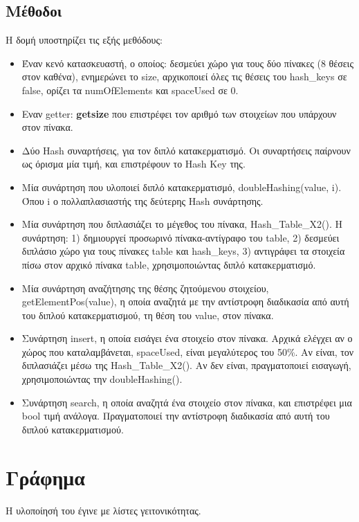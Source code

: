 \documentclass[12pt,a4paper]{article}
\begin{document}
    \subsection*{Μέθοδοι}
    Η δομή υποστηρίζει τις εξής μεθόδους:
    \begin{itemize}
        \item Έναν κενό κατασκευαστή, ο οποίος:  δεσμεύει χώρο  για  τους δύο πίνακες (8 θέσεις στον καθένα), 
        ενημερώνει το size, αρχικοποιεί όλες τις θέσεις του hash\_keys σε false, ορίζει τα numOfElements και spaceUsed σε 0. 
        \item Εναν getter: \textbf{getsize} που επιστρέφει τον αριθμό των στοιχείων που υπάρχουν στον πίνακα.
        \item Δύο Hash συναρτήσεις, για τον διπλό κατακερματισμό. Οι συναρτήσεις παίρνουν ως όρισμα μία τιμή, και επιστρέφουν το Hash Key της.
        \item Μία συνάρτηση που υλοποιεί διπλό κατακερματισμό, doubleHashing(value, i). Όπου i ο πολλαπλασιαστής της δεύτερης Hash συνάρτησης.
        \item Μία συνάρτηση που διπλασιάζει το μέγεθος του πίνακα, Hash\_Table\_X2(). Η συνάρτηση: 1) δημιουργεί προσωρινό πίνακα-αντίγραφο του table, 
        2) δεσμεύει διπλάσιο χώρο για τους πίνακες table και hash\_keys, 3) αντιγράφει τα στοιχεία πίσω στον αρχικό πίνακα table, 
        χρησιμοποιώντας διπλό κατακερματισμό.
        \item Μία συνάρτηση αναζήτησης της θέσης ζητούμενου στοιχείου,\\getElementPos(value), η οποία αναζητά με την αντίστροφη διαδικασία από αυτή του 
        διπλού κατακερματισμού, τη θέση του value, στον πίνακα. 
        \item Συνάρτηση insert, η οποία εισάγει ένα στοιχείο στον πίνακα. Αρχικά ελέγχει αν ο χώρος που καταλαμβάνεται, spaceUsed, είναι μεγαλύτερος του 50\%. 
        Αν είναι, τον διπλασιάζει μέσω της Hash\_Table\_X2(). Αν δεν είναι, πραγματοποιεί εισαγωγή, χρησιμοποιώντας την doubleHashing(). 
        \item Συνάρτηση search, η οποία αναζητά ένα στοιχείο στον πίνακα, και επιστρέφει μια bool τιμή ανάλογα.  Πραγματοποιεί την αντίστροφη διαδικασία από αυτή του διπλού κατακερματισμού. 
    \end{itemize}
    \section{Γράφημα}
    Η υλοποίησή του έγινε με λίστες γειτονικότητας.
\end{document}
